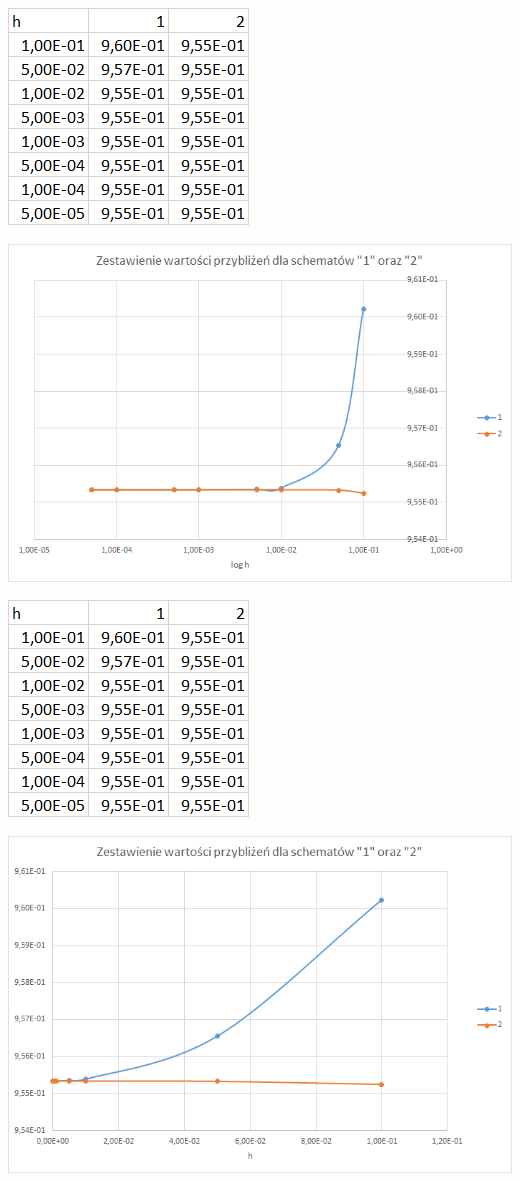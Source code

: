 \includegraphics{Lab2/charts/wsp_log_e_dane.png}

\includegraphics{Lab2/charts/wsp_log_e.png}
\newpage

\includegraphics{Lab2/charts/wsp_log_e_dane.png}

\includegraphics{Lab2/charts/wsp_e.png}
\newpage











